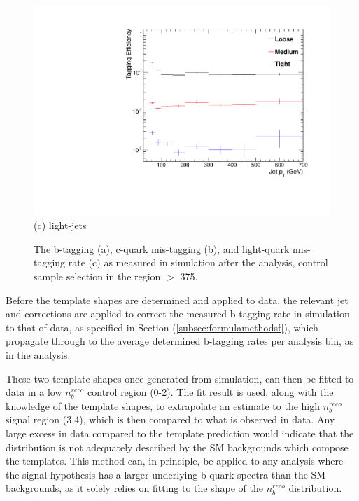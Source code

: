 \begin{figure}[ht]
\begin{minipage}[b]{0.48\linewidth}
\includegraphics[width = 1.0\linewidth]{plots/lighjet_PtDistribution_Htbin_Template_375.pdf}
\centering (c) light-jets
\end{minipage}
\caption[The b-tagging (a), c-quark mis-tagging (b), and light-quark mis-tagging rate (c$)$ as measured in simulation after the \alphat analysis, \mupjets control sample selection in the region \theht $>$ 375.]{The b-tagging (a), c-quark mis-tagging (b), and light-quark mis-tagging rate (c$)$ as measured in simulation after the \alphat analysis, \mupjets control sample selection in the region \theht $>$ 375.}
\label{fig:templatetaggingefficiencies}
\end{figure}

Before the template shapes are determined and applied to data, the relevant jet \pt and \eta corrections are applied to correct the measured b-tagging rate in simulation to that of data, as specified in Section (\ref{subsec:formulamethodsf}), which propagate through to the average determined b-tagging rates per analysis \theht bin, as in the \alphat analysis.  

These two template shapes once generated from simulation, can then be fitted to data in a low $n_{b}^{reco}$ control region (0-2). The fit result is used, along with the knowledge of the template shapes, to extrapolate an estimate to the high $n_{b}^{reco}$ signal region (3,4), which is then compared to what is observed in data. Any large excess in data compared to the template prediction would indicate that the \nbreco distribution is not adequately described by the \ac{SM} backgrounds which compose the templates. This method can, in principle, be applied to any analysis where the signal hypothesis has a larger underlying b-quark spectra than the \ac{SM} backgrounds, as it solely relies on fitting to the shape of the $n_{b}^{reco}$ distribution. 


